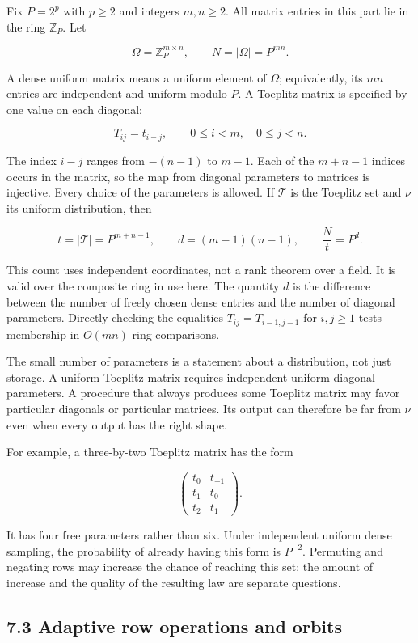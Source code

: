 \documentclass[
]{article}
\begin{document}
Fix \(P=2^p\) with \(p\ge2\) and integers \(m,n\ge2\). All matrix
entries in this part lie in the ring \(\mathbb Z_P\). Let

\[
\Omega=\mathbb Z_P^{m\times n},\qquad N=|\Omega|=P^{mn}.
\]

A dense uniform matrix means a uniform element of \(\Omega\);
equivalently, its \(mn\) entries are independent and uniform modulo
\(P\). A Toeplitz matrix is specified by one value on each diagonal:

\[
T_{ij}=t_{i-j},\qquad 0\le i<m,\quad 0\le j<n.
\]

The index \(i-j\) ranges from \(-(n-1)\) to \(m-1\). Each of the
\(m+n-1\) indices occurs in the matrix, so the map from diagonal
parameters to matrices is injective. Every choice of the parameters is
allowed. If \(\mathcal T\) is the Toeplitz set and \(\nu\) its uniform
distribution, then

\[
t=|\mathcal T|=P^{m+n-1},\qquad
d=(m-1)(n-1),\qquad \frac{N}{t}=P^d.
\]

This count uses independent coordinates, not a rank theorem over a
field. It is valid over the composite ring in use here. The quantity
\(d\) is the difference between the number of freely chosen dense
entries and the number of diagonal parameters. Directly checking the
equalities \(T_{ij}=T_{i-1,j-1}\) for \(i,j\ge1\) tests membership in
\(O(mn)\) ring comparisons.

The small number of parameters is a statement about a distribution, not
just storage. A uniform Toeplitz matrix requires independent uniform
diagonal parameters. A procedure that always produces some Toeplitz
matrix may favor particular diagonals or particular matrices. Its output
can therefore be far from \(\nu\) even when every output has the right
shape.

For example, a three-by-two Toeplitz matrix has the form

\[
\begin{pmatrix}
t_0&t_{-1}\\
t_1&t_0\\
t_2&t_1
\end{pmatrix}.
\]

It has four free parameters rather than six. Under independent uniform
dense sampling, the probability of already having this form is
\(P^{-2}\). Permuting and negating rows may increase the chance of
reaching this set; the amount of increase and the quality of the
resulting law are separate questions.

\subsection{7.3 Adaptive row operations and
orbits}\label{adaptive-row-operations-and-orbits}
\end{document}
